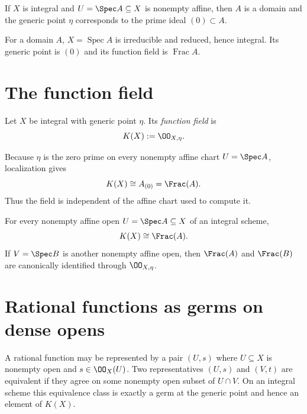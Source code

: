 \begin{proposition}\label{prop:vi27-generic-affine}
If $X$ is integral and $U=\Spec A\subseteq X$ is nonempty affine, then $A$ is a domain and the generic point
$\eta$ corresponds to the prime ideal $(0)\subset A$.
\end{proposition}



\begin{example}\label{ex:vi27-expand-01}
For a domain $A$, $X=\operatorname{Spec}A$ is irreducible and reduced, hence integral.  Its generic point is $(0)$ and its function field is $\operatorname{Frac}A$.
\end{example}
\section{The function field}
\begin{definition}\label{def:vi27-function-field}
Let $X$ be integral with generic point $\eta$.  Its \emph{function field} is
\[
K(X):=\OO_{X,\eta}.
\]
\end{definition}

Because $\eta$ is the zero prime on every nonempty affine chart $U=\Spec A$, localization gives
\[
K(X)\cong A_{(0)}=\Frac(A).
\]
Thus the field is independent of the affine chart used to compute it.

\begin{theorem}\label{thm:vi27-affine-function-field}
For every nonempty affine open $U=\Spec A\subseteq X$ of an integral scheme,
\[
K(X)\cong\Frac(A).
\]
If $V=\Spec B$ is another nonempty affine open, then $\Frac(A)$ and $\Frac(B)$ are canonically identified through
$\OO_{X,\eta}$.
\end{theorem}



\section{Rational functions as germs on dense opens}
A rational function may be represented by a pair $(U,s)$ where $U\subseteq X$ is nonempty open and
$s\in\OO_X(U)$.  Two representatives $(U,s)$ and $(V,t)$ are equivalent if they agree on some nonempty open
subset of $U\cap V$.  On an integral scheme this equivalence class is exactly a germ at the generic point and
hence an element of $K(X)$.

